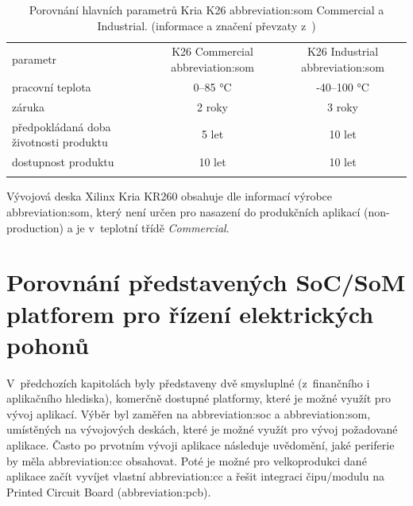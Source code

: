 \documentclass[a4paper, twoside, 11pt]{article}
\begin{document}
					\begin{table}[htbp!]
						\centering
						\caption{Porovnání hlavních parametrů Kria K26 \gls{abbreviation:som} Commercial a Industrial. (informace a značení převzaty z~\cite{kria-k26-som-product-brief})}
						  \vspace*{0.15cm}
						   \resizebox{\textwidth}{!}
							{
								\begin{tabular}{!{\vrule width 2pt} l | c | c !{\vrule width 2pt}}
								parametr & K26 Commercial \gls{abbreviation:som} & K26 Industrial \gls{abbreviation:som} \\
								pracovní teplota & 0–85 °C & -40–100 °C\\ \hline
								záruka & 2 roky & 3 roky\\ \hline
								předpokládaná doba životnosti produktu & 5 let & 10 let\\ \hline 
								dostupnost produktu & 10 let & 10 let \\
								\end{tabular}
							}
						\label{tab:xilinx-kria-som-variants}
					\end{table}

					Vývojová deska Xilinx Kria KR260 obsahuje dle informací výrobce \gls{abbreviation:som}, který není určen pro nasazení do produkčních aplikací (non-production) a je v~teplotní třídě \textit{Commercial}. \cite{kria-k26-som-ds}
				

			\section{Porovnání představených SoC/SoM platforem pro řízení elektrických pohonů}
			V~předchozích kapitolách byly představeny dvě smysluplné (z~finančního i aplikačního hlediska), komerčně dostupné platformy, které je možné využít pro vývoj aplikací. Výběr byl zaměřen na \gls{abbreviation:soc} a \gls{abbreviation:som}, umístěných na vývojových deskách, které je možné využít pro vývoj požadované aplikace. Často po prvotním vývoji aplikace následuje uvědomění, jaké periferie by měla \gls{abbreviation:cc} obsahovat. Poté je možné pro velkoprodukci dané aplikace začít vyvíjet vlastní \gls{abbreviation:cc} a řešit integraci čipu/modulu na Printed Circuit Board (\gls{abbreviation:pcb}).\par
\end{document}
